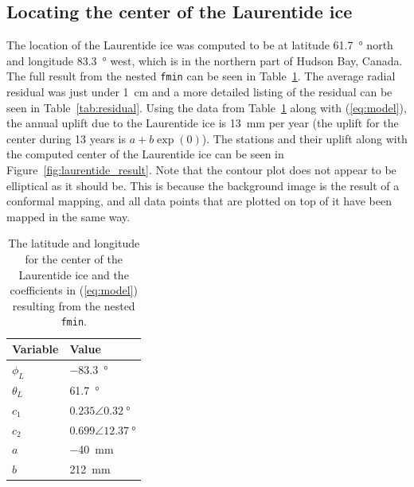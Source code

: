 \documentclass[12pt,a4paper]{article}
\begin{document}
\subsection{Locating the center of the Laurentide ice}
The location of the Laurentide ice was computed to be at latitude \SI{61.7}{\degree} north and longitude \SI{83.3}{\degree} west, which is in the northern part of Hudson Bay, Canada.
The full result from the nested \texttt{fmin} can be seen in Table~\ref{tab:fmin}.
The average radial residual was just under \SI{1}{\centi\meter} and a more detailed listing of the residual can be seen in Table~\ref{tab:residual}.
Using the data from Table~\ref{tab:fmin} along with (\ref{eq:model}), the annual uplift due to the Laurentide ice is \SI{13}{\milli\meter} per year (the uplift for the center during 13 years is $a + b\exp(0)$).
The stations and their uplift along with the computed center of the Laurentide ice can be seen in Figure~\ref{fig:laurentide_result}.
Note that the contour plot does not appear to be elliptical as it should be.
This is because the background image is the result of a conformal mapping, and all data points that are plotted on top of it have been mapped in the same way.

\begin{table}[!ht]
  \centering
  \caption{The latitude and longitude for the center of the Laurentide ice and the coefficients in (\ref{eq:model}) resulting from the nested \texttt{fmin}.}
  \begin{tabular}{|l|l|} \hline
    Variable & Value \\ \hline
    $\phi_L$ & \SI{-83.3}{\degree} \\
    $\theta_L$ & \SI{61.7}{\degree} \\
    $c_1$ & $0.235 \angle{\SI{0.32}{\degree}}$ \\
    $c_2$ & $0.699 \angle{\SI{12.37}{\degree}}$ \\
    $a$ & \SI{-40}{\milli\meter} \\
    $b$ & \SI{212}{\milli\meter} \\\hline
  \end{tabular}
  \label{tab:fmin}
\end{table}
\end{document}
